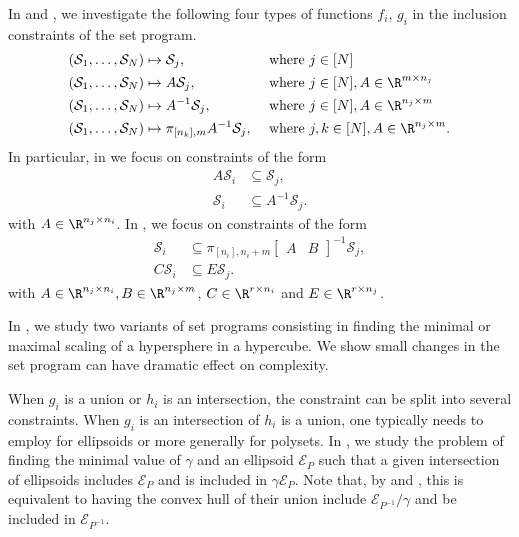 \documentclass[11pt,twoside,a4paper,openright]{uclouvain-thesis}
\begin{document}
In  and , we investigate the following four types of functions $f_i$, $g_i$ in the inclusion constraints of the set program.
\begin{align*}
  (\mathcal{S}_1, \ldots, \mathcal{S}_N) & \mapsto \mathcal{S}_j, & & \text{ where }j \in [N]\\
  (\mathcal{S}_1, \ldots, \mathcal{S}_N) & \mapsto A\mathcal{S}_j, & & \text{ where }j \in [N], A \in \R^{m \times n_j}\\
  (\mathcal{S}_1, \ldots, \mathcal{S}_N) & \mapsto A^{-1}\mathcal{S}_j, & & \text{ where }j \in [N], A \in \R^{n_j \times m}\\
  (\mathcal{S}_1, \ldots, \mathcal{S}_N) & \mapsto \pi_{[n_k], m} A^{-1}\mathcal{S}_j, & & \text{ where }j, k \in [N], A \in \R^{n_j \times m}.
\end{align*}
In particular, in  we focus on constraints of the form
\begin{align}
  \label{eq:imageincl}
  A\mathcal{S}_i & \subseteq \mathcal{S}_j,\\
  \label{eq:preimageincl}
  \mathcal{S}_i & \subseteq A^{-1}\mathcal{S}_j.
\end{align}
with $A \in \R^{n_j \times n_i}$.
In , we focus on constraints of the form
\begin{align}
  \label{eq:projectpreimageincl}
  \mathcal{S}_i & \subseteq \pi_{[n_i], n_i + m}
  \begin{bmatrix}
    A & B
  \end{bmatrix}^{-1} \mathcal{S}_j,\\
  \label{eq:algincl}
  C\mathcal{S}_i & \subseteq E\mathcal{S}_j.
\end{align}
with $A \in \R^{n_j \times n_i}, B \in \R^{n_j \times m}$, $C \in \R^{r \times n_i}$ and $E \in \R^{r \times n_j}$.

In , we study two variants of set programs consisting in finding the
minimal or maximal scaling of a hypersphere in a hypercube.
We show small changes in the set program can have dramatic effect on complexity.

When $g_i$ is a union or $h_i$ is an intersection, the constraint can be split into
several constraints.
When $g_i$ is an intersection of $h_i$ is a union,
one typically needs to employ  for ellipsoids
or more generally  for polysets.
In , we study the problem of finding the minimal value of $\gamma$
and an ellipsoid $\mathcal{E}_P$ such that a given intersection of ellipsoids includes $\mathcal{E}_P$ and is included in $\gamma\mathcal{E}_P$.
Note that, by  and , this is equivalent to having the convex hull of their union include $\mathcal{E}_{P^{-1}}/\gamma$ and be included in $\mathcal{E}_{P^{-1}}$.
\end{document}
